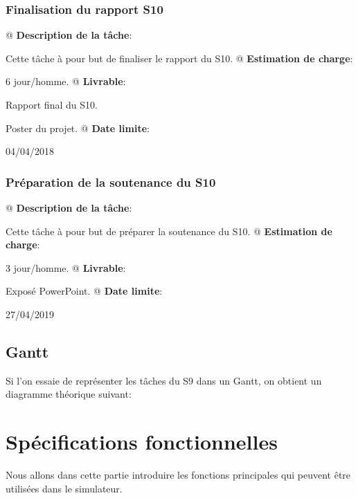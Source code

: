 \documentclass[final]{polytech/polytech}
\begin{document}
		\subsection{Finalisation du rapport S10}
			\begin{easylist}
				@ \textbf{Description de la tâche}:
				
				Cette tâche à pour but de finaliser le rapport du S10.			
				@ \textbf{Estimation de charge}:
				
				6 jour/homme.
				@ \textbf{Livrable}:
				
				Rapport final du S10.
				
				Poster du projet.
				@ \textbf{Date limite}:
				
				04/04/2018
			\end{easylist}
			
		\subsection{Préparation de la soutenance du S10}
			\begin{easylist}
				@ \textbf{Description de la tâche}:
				
				Cette tâche à pour but de préparer la soutenance du S10.
				@ \textbf{Estimation de charge}:
				
				3 jour/homme.
				@ \textbf{Livrable}:
				
				Exposé PowerPoint.
				@ \textbf{Date limite}:
				
				27/04/2019
			\end{easylist}
	\section{Gantt}
		Si l'on essaie de représenter les tâches du S9 dans un Gantt, on obtient un diagramme théorique suivant:

\chapter{Spécifications fonctionnelles}
	Nous allons dans cette partie introduire les fonctions principales qui peuvent être utilisées dans le simulateur.
	
\end{document}
